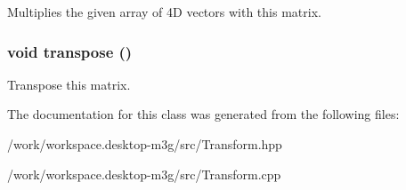 Multiplies the given array of 4D vectors with this matrix. \hypertarget{classm3g_1_1Transform_f3a99ffb20127be48232d12260e934dc}{
\subsubsection[{transpose}]{\setlength{\rightskip}{0pt plus 5cm}void transpose ()}}
\label{classm3g_1_1Transform_f3a99ffb20127be48232d12260e934dc}


Transpose this matrix. 

The documentation for this class was generated from the following files:\begin{CompactItemize}
\item 
/work/workspace.desktop-m3g/src/Transform.hpp\item 
/work/workspace.desktop-m3g/src/Transform.cpp\end{CompactItemize}
